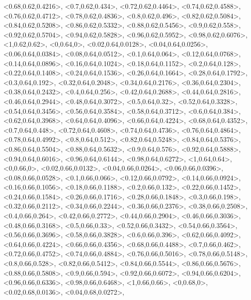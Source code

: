 \documentclass[a4paper,10pt]{article}
\begin{document}
\begin{eulernotebook}
\begin{euleroutput}
  <0.68,0.62,0.4216>,
  <0.7,0.62,0.434>,
  <0.72,0.62,0.4464>,
  <0.74,0.62,0.4588>,
  <0.76,0.62,0.4712>,
  <0.78,0.62,0.4836>,
  <0.8,0.62,0.496>,
  <0.82,0.62,0.5084>,
  <0.84,0.62,0.5208>,
  <0.86,0.62,0.5332>,
  <0.88,0.62,0.5456>,
  <0.9,0.62,0.558>,
  <0.92,0.62,0.5704>,
  <0.94,0.62,0.5828>,
  <0.96,0.62,0.5952>,
  <0.98,0.62,0.6076>,
  <1,0.62,0.62>,
  <0,0.64,0>,
  <0.02,0.64,0.0128>,
  <0.04,0.64,0.0256>,
  <0.06,0.64,0.0384>,
  <0.08,0.64,0.0512>,
  <0.1,0.64,0.064>,
  <0.12,0.64,0.0768>,
  <0.14,0.64,0.0896>,
  <0.16,0.64,0.1024>,
  <0.18,0.64,0.1152>,
  <0.2,0.64,0.128>,
  <0.22,0.64,0.1408>,
  <0.24,0.64,0.1536>,
  <0.26,0.64,0.1664>,
  <0.28,0.64,0.1792>,
  <0.3,0.64,0.192>,
  <0.32,0.64,0.2048>,
  <0.34,0.64,0.2176>,
  <0.36,0.64,0.2304>,
  <0.38,0.64,0.2432>,
  <0.4,0.64,0.256>,
  <0.42,0.64,0.2688>,
  <0.44,0.64,0.2816>,
  <0.46,0.64,0.2944>,
  <0.48,0.64,0.3072>,
  <0.5,0.64,0.32>,
  <0.52,0.64,0.3328>,
  <0.54,0.64,0.3456>,
  <0.56,0.64,0.3584>,
  <0.58,0.64,0.3712>,
  <0.6,0.64,0.384>,
  <0.62,0.64,0.3968>,
  <0.64,0.64,0.4096>,
  <0.66,0.64,0.4224>,
  <0.68,0.64,0.4352>,
  <0.7,0.64,0.448>,
  <0.72,0.64,0.4608>,
  <0.74,0.64,0.4736>,
  <0.76,0.64,0.4864>,
  <0.78,0.64,0.4992>,
  <0.8,0.64,0.512>,
  <0.82,0.64,0.5248>,
  <0.84,0.64,0.5376>,
  <0.86,0.64,0.5504>,
  <0.88,0.64,0.5632>,
  <0.9,0.64,0.576>,
  <0.92,0.64,0.5888>,
  <0.94,0.64,0.6016>,
  <0.96,0.64,0.6144>,
  <0.98,0.64,0.6272>,
  <1,0.64,0.64>,
  <0,0.66,0>,
  <0.02,0.66,0.0132>,
  <0.04,0.66,0.0264>,
  <0.06,0.66,0.0396>,
  <0.08,0.66,0.0528>,
  <0.1,0.66,0.066>,
  <0.12,0.66,0.0792>,
  <0.14,0.66,0.0924>,
  <0.16,0.66,0.1056>,
  <0.18,0.66,0.1188>,
  <0.2,0.66,0.132>,
  <0.22,0.66,0.1452>,
  <0.24,0.66,0.1584>,
  <0.26,0.66,0.1716>,
  <0.28,0.66,0.1848>,
  <0.3,0.66,0.198>,
  <0.32,0.66,0.2112>,
  <0.34,0.66,0.2244>,
  <0.36,0.66,0.2376>,
  <0.38,0.66,0.2508>,
  <0.4,0.66,0.264>,
  <0.42,0.66,0.2772>,
  <0.44,0.66,0.2904>,
  <0.46,0.66,0.3036>,
  <0.48,0.66,0.3168>,
  <0.5,0.66,0.33>,
  <0.52,0.66,0.3432>,
  <0.54,0.66,0.3564>,
  <0.56,0.66,0.3696>,
  <0.58,0.66,0.3828>,
  <0.6,0.66,0.396>,
  <0.62,0.66,0.4092>,
  <0.64,0.66,0.4224>,
  <0.66,0.66,0.4356>,
  <0.68,0.66,0.4488>,
  <0.7,0.66,0.462>,
  <0.72,0.66,0.4752>,
  <0.74,0.66,0.4884>,
  <0.76,0.66,0.5016>,
  <0.78,0.66,0.5148>,
  <0.8,0.66,0.528>,
  <0.82,0.66,0.5412>,
  <0.84,0.66,0.5544>,
  <0.86,0.66,0.5676>,
  <0.88,0.66,0.5808>,
  <0.9,0.66,0.594>,
  <0.92,0.66,0.6072>,
  <0.94,0.66,0.6204>,
  <0.96,0.66,0.6336>,
  <0.98,0.66,0.6468>,
  <1,0.66,0.66>,
  <0,0.68,0>,
  <0.02,0.68,0.0136>,
  <0.04,0.68,0.0272>,

\end{euleroutput}
\end{eulernotebook}
\end{document}
